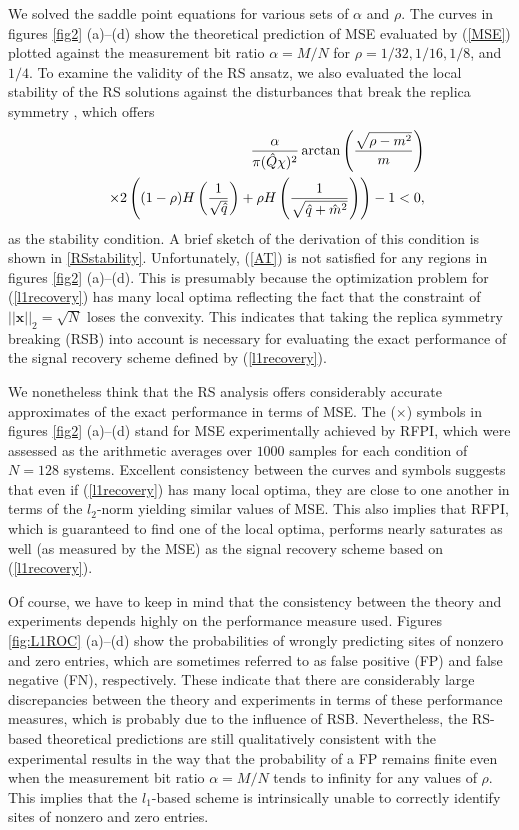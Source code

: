 \documentclass[12pt]{iopart}
\newcommand{\vm}[1]{\boldsymbol{#1}}
\begin{document}
We solved the saddle point equations for various sets of $\alpha$ and $\rho$. The curves in figures \ref{fig2} (a)--(d) show the theoretical prediction of MSE evaluated by (\ref{MSE}) plotted against the measurement bit ratio $\alpha=M/N$ for $\rho=1/32, 1/16, 1/8$, and $1/4$. To examine the validity of the RS ansatz, we also evaluated the local stability of the RS solutions against the disturbances that break the replica symmetry \cite{AT}, which offers 
\begin{eqnarray}
&&\frac{\alpha}{\pi (\hat{Q}\chi)^2} \arctan \left (\frac{\sqrt{\rho-m^2}}{m} \right ) \cr
&& \times 2\left ((1-\rho)H\left (\frac{1}{\sqrt{\hat{q}}} \right )
+\rho H\left (\frac{1}{\sqrt{\hat{q}+\hat{m}^2}} \right ) \right ) -1<0, 
\label{AT}
\end{eqnarray}
as the stability condition. A brief sketch of the derivation of this condition is shown in \ref{RSstability}. Unfortunately, (\ref{AT}) is not satisfied for any regions in figures \ref{fig2} (a)--(d). This is presumably because the optimization problem for (\ref{l1recovery}) has many local optima reflecting the fact that the constraint of $||\vm{x}||_2=\sqrt{N}$ loses the convexity. This indicates that taking the replica symmetry breaking (RSB) into account is necessary for evaluating the exact performance of the signal recovery scheme defined by (\ref{l1recovery}). 

We nonetheless think that the RS analysis offers considerably accurate approximates of the exact performance in terms of MSE. The ($\times$) symbols in figures \ref{fig2} (a)--(d) stand for MSE experimentally achieved by RFPI, which were assessed as the arithmetic averages over $1000$ samples for each condition of $N=128$ systems. Excellent consistency between the curves and symbols suggests that even if (\ref{l1recovery}) has many local optima, they are close to one another in terms of the $l_2$-norm yielding similar values of MSE. This also implies that RFPI, which is guaranteed to find one of the local optima, performs nearly saturates as well (as measured by the MSE) as the signal recovery scheme based on (\ref{l1recovery}). 

Of course, we have to keep in mind that the consistency between the theory and experiments depends highly on the performance measure used. Figures \ref{fig:L1ROC} (a)--(d) show the probabilities of wrongly predicting sites of nonzero and zero entries, which are sometimes referred to as false positive (FP) and false negative (FN), respectively. These indicate that there are considerably large discrepancies between the theory and experiments in terms of these performance measures, which is probably due to the influence of RSB. Nevertheless, the RS-based theoretical predictions are still qualitatively consistent with the experimental results in the way that the probability of a FP remains finite even when the measurement bit ratio $\alpha=M/N$ tends to infinity for any values of $\rho$. This implies that the $l_1$-based scheme is intrinsically unable to correctly identify sites of nonzero and zero entries. 
\end{document}
